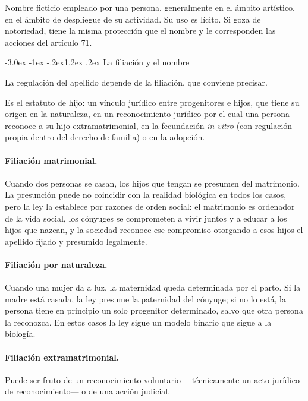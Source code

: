 \documentclass[12pt,oneside]{book}
\makeatletter
\renewcommand\section{\@startsection{section}{1}{\z@}%
  {-3.0ex \@plus -1ex \@minus -.2ex}{1.2ex \@plus .2ex}%
  {\normalfont\large\bfseries\color{acento}}}
\makeatother
\begin{document}
\begin{definicion}[Seudónimo]
Nombre ficticio empleado por una persona, generalmente en el ámbito artístico, en el ámbito de despliegue de su actividad. Su uso es lícito. Si goza de notoriedad, tiene la misma protección que el nombre y le corresponden las acciones del artículo 71.
\end{definicion}

\section{La filiación y el nombre}
\label{sec:filiacion}

La regulación del apellido depende de la filiación, que conviene precisar.

\begin{definicion}[Filiación]
Es el estatuto de hijo: un vínculo jurídico entre progenitores e hijos, que tiene su origen en la naturaleza, en un reconocimiento jurídico por el cual una persona reconoce a su hijo extramatrimonial, en la fecundación \textit{in vitro} (con regulación propia dentro del derecho de familia) o en la adopción.
\end{definicion}

\paragraph{Filiación matrimonial.} Cuando dos personas se casan, los hijos que tengan se presumen del matrimonio. La presunción puede no coincidir con la realidad biológica en todos los casos, pero la ley la establece por razones de orden social: el matrimonio es ordenador de la vida social, los cónyuges se comprometen a vivir juntos y a educar a los hijos que nazcan, y la sociedad reconoce ese compromiso otorgando a esos hijos el apellido fijado y presumido legalmente.

\paragraph{Filiación por naturaleza.} Cuando una mujer da a luz, la maternidad queda determinada por el parto. Si la madre está casada, la ley presume la paternidad del cónyuge; si no lo está, la persona tiene en principio un solo progenitor determinado, salvo que otra persona la reconozca. En estos casos la ley sigue un modelo binario que sigue a la biología.

\paragraph{Filiación extramatrimonial.} Puede ser fruto de un reconocimiento voluntario ---técnicamente un acto jurídico de reconocimiento--- o de una acción judicial.
\end{document}
